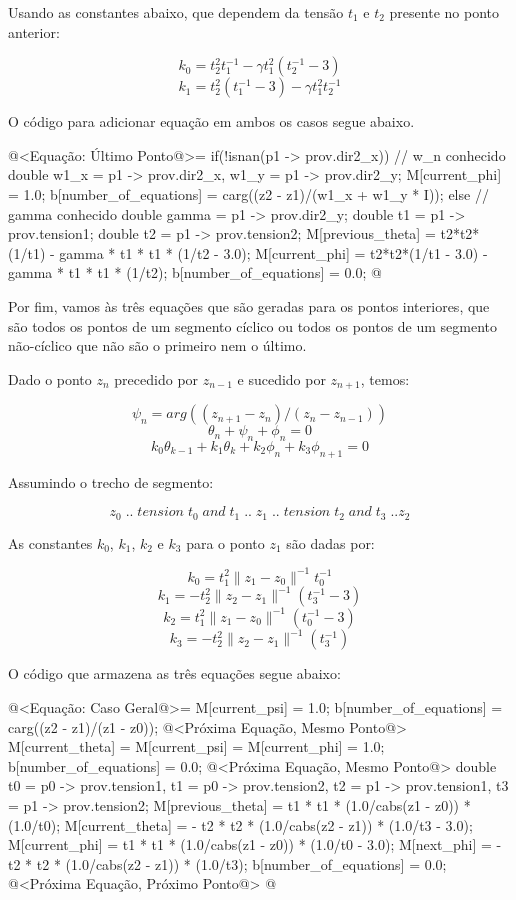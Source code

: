 Usando as constantes abaixo, que dependem da tensão $t_1$ e $t_2$
presente no ponto anterior:

$$
k_0=t_2^2t_1^{-1}-\gamma t_1^2(t_2^{-1}-3)
$$
$$
k_1=t_2^2(t_1^{-1}-3)-\gamma t_1^2t_2^{-1}
$$

O código para adicionar equação em ambos os casos segue abaixo.

\iniciocodigo
@<Equação: Último Ponto@>=
if(!isnan(p1 -> prov.dir2_x)){ // w_n conhecido
  double w1_x = p1 -> prov.dir2_x, w1_y = p1 -> prov.dir2_y;
  M[current_phi] = 1.0;
  b[number_of_equations] = carg((z2 - z1)/(w1_x + w1_y * I));
}
else{ // gamma conhecido
  double gamma = p1 -> prov.dir2_y;
  double t1 = p1 -> prov.tension1;
  double t2 = p1 -> prov.tension2;
  M[previous_theta] = t2*t2*(1/t1) - gamma * t1 * t1 * (1/t2 - 3.0);
  M[current_phi] = t2*t2*(1/t1 - 3.0) - gamma * t1 * t1 * (1/t2);
  b[number_of_equations] = 0.0;
}
@
\fimcodigo

Por fim, vamos às três equações que são geradas para os pontos
interiores, que são todos os pontos de um segmento cíclico ou todos os
pontos de um segmento não-cíclico que não são o primeiro nem o último.

Dado o ponto $z_n$ precedido por $z_{n-1}$ e sucedido por $z_{n+1}$,
temos:

$$
\psi_n = arg((z_{n+1}-z_n)/(z_n-z_{n-1}))
$$
$$
\theta_n + \psi_n + \phi_n = 0
$$
$$
k_0\theta_{k-1} + k_1\theta_k + k_2\phi_n + k_3\phi_{n+1} = 0
$$

Assumindo o trecho de segmento:

$$
z_0\; ..\; tension\; t_0\; and\; t_1\; ..\; z_1\; ..\; tension\; t_2\; and\; t_3
\; .. z_2
$$

As constantes $k_0$, $k_1$, $k_2$ e $k_3$ para o ponto $z_1$ são dadas por:

$$
k_0 = t_1^2\|z_1-z_0\|^{-1}t_0^{-1}
$$
$$
k_1 = - t_2^2\|z_2-z_1\|^{-1}(t_3^{-1}-3)
$$
$$
k_2 = t_1^2\|z_1-z_0\|^{-1}(t_0^{-1} - 3)
$$
$$
k_3 = - t_2^2\|z_2-z_1\|^{-1}(t_3^{-1})
$$

O código que armazena as três equações segue abaixo:

\iniciocodigo
@<Equação: Caso Geral@>=
M[current_psi] = 1.0;
b[number_of_equations] = carg((z2 - z1)/(z1 - z0));
@<Próxima Equação, Mesmo Ponto@>
M[current_theta] = M[current_psi] = M[current_phi] = 1.0;
b[number_of_equations] = 0.0;
@<Próxima Equação, Mesmo Ponto@>
{
  double t0 = p0 -> prov.tension1, t1 = p0 -> prov.tension2,
         t2 = p1 -> prov.tension1, t3 = p1 -> prov.tension2;
  M[previous_theta] = t1 * t1 * (1.0/cabs(z1 - z0)) * (1.0/t0);
  M[current_theta] = - t2 * t2 * (1.0/cabs(z2 - z1)) * (1.0/t3 - 3.0);
  M[current_phi] = t1 * t1 * (1.0/cabs(z1 - z0)) * (1.0/t0 - 3.0);
  M[next_phi] = - t2 * t2 * (1.0/cabs(z2 - z1)) * (1.0/t3);
  b[number_of_equations] = 0.0;
  @<Próxima Equação, Próximo Ponto@>
}
@
\fimcodigo

